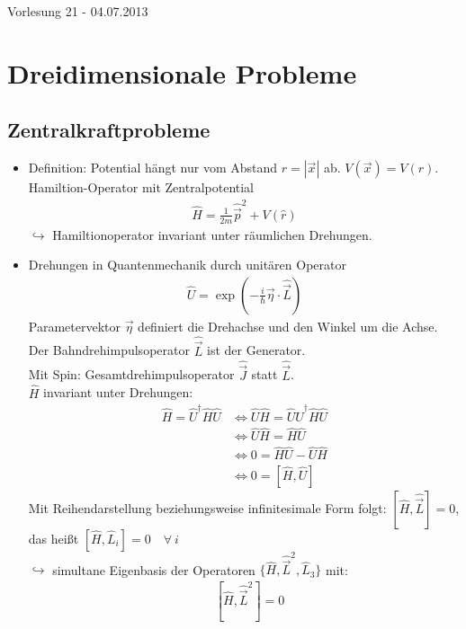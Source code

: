 \documentclass[10pt,article,colorback,accentcolor=tud9d]{scrartcl}
\begin{document}
\begin{flushright}
Vorlesung 21 - 04.07.2013
\end{flushright}

\section{Dreidimensionale Probleme}
\subsection{Zentralkraftprobleme}
\begin{itemize}
  \item Definition: Potential hängt nur vom Abstand $r=|\vec{x}|$ ab. $V(\vec{x})=V(r)$.\\
    Hamiltion-Operator mit Zentralpotential
    \begin{align}
    \hat{H}=\frac{1}{2m}\hat{\vec{p}}^2+V(\hat{r})
    \end{align}
    $\hookrightarrow$ Hamiltionoperator invariant unter räumlichen Drehungen.
  \item Drehungen in Quantenmechanik durch unitären Operator 
    \begin{align}
    \hat{U}=\exp\left(-\frac{i}{\hbar}\vec{\eta}\cdot\hat{\vec{L}}\right)
    \end{align}
    Parametervektor $\vec{\eta}$ definiert die Drehachse und den Winkel um die Achse. Der Bahndrehimpulsoperator $\hat{\vec{L}}$ ist der Generator.\\
    Mit Spin: Gesamtdrehimpulsoperator $\hat{\vec{J}}$ statt $\hat{\vec{L}}$.\\
    $\hat{H}$ invariant unter Drehungen:
    \begin{align}
    \hat{H}=\hat{U}^\dagger\hat{H}\hat{U}&\Leftrightarrow \hat{U}\hat{H}=\hat{U}\hat{U}^\dagger\hat{H}\hat{U}\\
    &\Leftrightarrow\hat{U}\hat{H}=\hat{H}\hat{U}\\
    &\Leftrightarrow 0=\hat{H}\hat{U}-\hat{U}\hat{H}\\
    &\Leftrightarrow0=[\hat{H},\hat{U}]
    \end{align}
    Mit Reihendarstellung beziehungsweise infinitesimale Form folgt: $[\hat{H},\hat{\vec{L}}]=0$, das heißt $[\hat{H},\hat{L}_i]=0\quad \forall\ i$\\
    $\hookrightarrow$ simultane Eigenbasis der Operatoren $\{\hat{H},\hat{\vec{L}}^2,\hat{L}_3\}$ mit:
    \begin{align}
    &[\hat{H},\hat{\vec{L}}^2]=0\\

\end{align}
\end{itemize}
\end{document}
